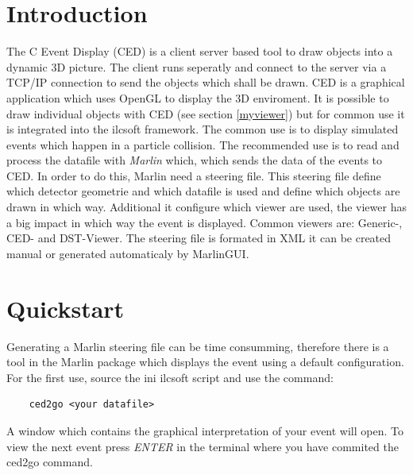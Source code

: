 \documentclass[a4paper,10pt]{article}
\begin{document}
\section{Introduction}
The C Event Display (CED) is a client server based tool to draw objects into a dynamic 3D picture. 
The client runs seperatly and connect to the server via a TCP/IP connection to send the objects which shall be drawn. 
CED is a graphical application which uses OpenGL to display the 3D enviroment. 
It is possible to draw individual objects with CED (see section \ref{myviewer}) but for common use it is integrated into the ilcsoft framework.
The common use  is to display simulated events which happen in a particle collision. 
The recommended use is to read and process the datafile with \textit{Marlin} which, which sends the data of the events to CED. 
In order to do this, Marlin need a steering file. 
This steering file define which detector geometrie and which datafile is used and define which objects are drawn in which way.
Additional it configure which viewer are used, the viewer has a big impact in which way the event is displayed. 
Common viewers are: Generic-, CED- and DST-Viewer.
The steering file is formated in XML it can be created manual or generated automaticaly by MarlinGUI.

\section{Quickstart}
Generating a Marlin steering file can be time consumming, therefore there is a tool in the Marlin package which displays the event using a default configuration. 
For the first use, source the ini ilcsoft script and use the command: 
\begin{verbatim}
    ced2go <your datafile>
\end{verbatim}
A window which contains the graphical interpretation of your event will open. 
To view the next event press \textit{ENTER} in the terminal where you have commited the ced2go command.
\end{document}
